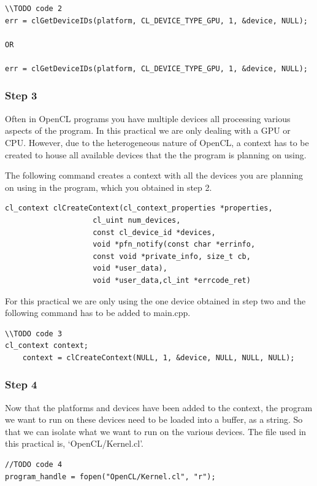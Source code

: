 \begin{lstlisting}
\\TODO code 2
err = clGetDeviceIDs(platform, CL_DEVICE_TYPE_GPU, 1, &device, NULL);

OR

err = clGetDeviceIDs(platform, CL_DEVICE_TYPE_GPU, 1, &device, NULL);
\end{lstlisting}


\subsubsection{Step 3}
Often in OpenCL programs you have multiple devices all processing various aspects of the program. In this practical we are only dealing with a GPU or CPU. However, due to the heterogeneous nature of OpenCL, a context has to be created to house all available devices that the the program is planning on using. 

The following command creates a context with all the devices you are planning on using in the program, which you obtained in step 2.
\begin{lstlisting}
cl_context clCreateContext(cl_context_properties *properties,
					cl_uint num_devices,
					const cl_device_id *devices,
					void *pfn_notify(const char *errinfo, 
					const void *private_info, size_t cb, 
					void *user_data),
					void *user_data,cl_int *errcode_ret)
\end{lstlisting}

For this practical we are only using the one device obtained in step two and the following command has to be added to main.cpp.

\begin{lstlisting}
\\TODO code 3
cl_context context;
	context = clCreateContext(NULL, 1, &device, NULL, NULL, NULL);
\end{lstlisting}

\subsubsection{Step 4}
Now that the platforms and devices have been added to the context, the program we want to run on these devices need to be loaded into a buffer, as a string. So that we can isolate what we want to run on the various devices. The file used in this practical is, `OpenCL/Kernel.cl'.

\begin{lstlisting}
//TODO code 4
program_handle = fopen("OpenCL/Kernel.cl", "r");
\end{lstlisting}


